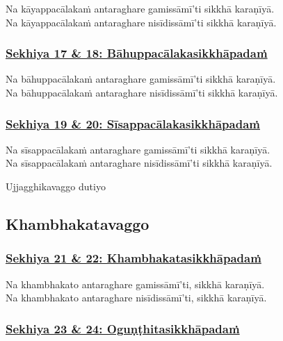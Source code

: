 Na kāyappacālakaṁ antaraghare gamissāmī'ti sikkhā karaṇīyā.\\
Na kāyappacālakaṁ antaraghare nisīdissāmī'ti sikkhā karaṇīyā.



\subsubsection*{\hyperref[training17-18]{Sekhiya 17 \& 18: Bāhuppacālakasikkhāpadaṁ}}
\label{sekh17-18}

Na bāhuppacālakaṁ antaraghare gamissāmī'ti sikkhā karaṇīyā.\\
Na bāhuppacālakaṁ antaraghare nisīdissāmī'ti sikkhā karaṇīyā.



\subsubsection*{\hyperref[training19-20]{Sekhiya 19 \& 20: Sīsappacālakasikkhāpadaṁ}}
\label{sekh19-20}

Na sīsappacālakaṁ antaraghare gamissāmī'ti sikkhā karaṇīyā.\\
Na sīsappacālakaṁ antaraghare nisīdissāmī'ti sikkhā karaṇīyā.

\begin{center}
	Ujjagghikavaggo dutiyo
\end{center}



\subsection{Khambhakatavaggo}

\subsubsection*{\hyperref[training21-22]{Sekhiya 21 \& 22: Khambhakatasikkhāpadaṁ}}
\label{sekh21-22}

Na khambhakato antaraghare gamissāmī'ti, sikkhā karaṇīyā.\\
Na khambhakato antaraghare nisīdissāmī'ti, sikkhā karaṇīyā.



\subsubsection*{\hyperref[training23-24]{Sekhiya 23 \& 24: Oguṇṭhitasikkhāpadaṁ}}
\label{sekh23-24}

